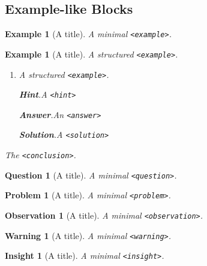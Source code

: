 \documentclass{sn-jnl}
\theoremstyle{thmstyleone}%
\theoremstyle{thmstyletwo}%
\newtheorem{question}[theorem]{Question}
\newtheorem{problem}[theorem]{Problem}
\newtheorem{example}[theorem]{Example}
\theoremstyle{thmstylethree}%
\newtheorem{warning}[theorem]{Warning}
\newtheorem{insight}[theorem]{Insight}
\newtheorem{observation}[theorem]{Observation}
\newcommand{\blocktitlefont}{\relax}
\newcommand{\mono}[1]{\texttt{#1}}
\numberwithin{equation}{section}
\begin{document}
\subsection{Example-like Blocks}\label{block-samples-example-like}%
\begin{example}[A title]\label{block-samples-example-like-2}%
%
A minimal \mono{<example>}.%
\end{example}
\begin{example}[A title]\label{block-samples-example-like-3}%
%
A structured \mono{<example>}.%
\begin{enumerate}[font=\bfseries,label=(\alph*),ref=\alph*]%
\item{}A structured \mono{<example>}.%
\par\smallskip%
\noindent\textbf{\blocktitlefont Hint}.\hypertarget{block-samples-example-like-3-3-2}{}\quad{}A \mono{<hint>}%
\par\smallskip%
\noindent\textbf{\blocktitlefont Answer}.\hypertarget{block-samples-example-like-3-3-3}{}\quad{}An \mono{<answer>}%
\par\smallskip%
\noindent\textbf{\blocktitlefont Solution}.\hypertarget{block-samples-example-like-3-3-4}{}\quad{}A \mono{<solution>}%
\end{enumerate}%
The \mono{<conclusion>}.%
\end{example}
\begin{question}[A title]\label{block-samples-example-like-4}%
%
A minimal \mono{<question>}.%
\end{question}
\begin{problem}[A title]\label{block-samples-example-like-5}%
%
A minimal \mono{<problem>}.%
\end{problem}
\begin{observation}[A title]\label{block-samples-example-like-6}%
%
A minimal \mono{<observation>}.%
\end{observation}
\begin{warning}[A title]\label{block-samples-example-like-7}%
%
A minimal \mono{<warning>}.%
\end{warning}
\begin{insight}[A title]\label{block-samples-example-like-8}%
%
A minimal \mono{<insight>}.%
\end{insight}
%
%
\typeout{************************************************}
\typeout{************************************************}
%
\end{document}
